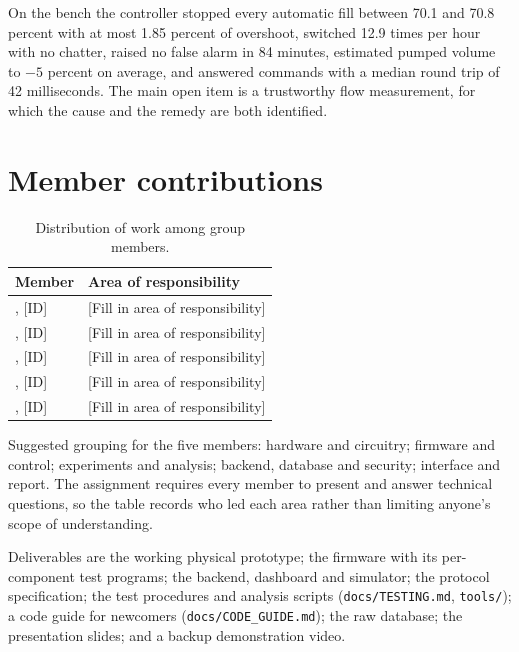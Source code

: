 On the bench the controller stopped every automatic fill between 70.1 and 70.8 percent with at most 1.85 percent of overshoot, switched 12.9 times per hour with no chatter, raised no false alarm in 84 minutes, estimated pumped volume to $-5$ percent on average, and answered commands with a median round trip of 42 milliseconds. The main open item is a trustworthy flow measurement, for which the cause and the remedy are both identified.

\section{Member contributions}

\begin{table}[H]
\caption{Distribution of work among group members.}
\label{tab:phancong}
\centering
\renewcommand{\arraystretch}{1.15}
\begin{tabular}{|p{4.2cm}|p{8.8cm}|}
\hline
\rowcolor[HTML]{B7E1F0}
\textbf{Member} & \textbf{Area of responsibility} \\
\hline
[Full name of member 1], [ID] & [Fill in area of responsibility] \\
\hline
[Full name of member 2], [ID] & [Fill in area of responsibility] \\
\hline
[Full name of member 3], [ID] & [Fill in area of responsibility] \\
\hline
[Full name of member 4], [ID] & [Fill in area of responsibility] \\
\hline
[Full name of member 5], [ID] & [Fill in area of responsibility] \\
\hline
\end{tabular}
\end{table}

Suggested grouping for the five members: hardware and circuitry; firmware and control; experiments and analysis; backend, database and security; interface and report. The assignment requires every member to present and answer technical questions, so the table records who led each area rather than limiting anyone's scope of understanding.

Deliverables are the working physical prototype; the firmware with its per-component test programs; the backend, dashboard and simulator; the protocol specification; the test procedures and analysis scripts (\texttt{docs/TESTING.md}, \texttt{tools/}); a code guide for newcomers (\texttt{docs/CODE\_GUIDE.md}); the raw database; the presentation slides; and a backup demonstration video.
